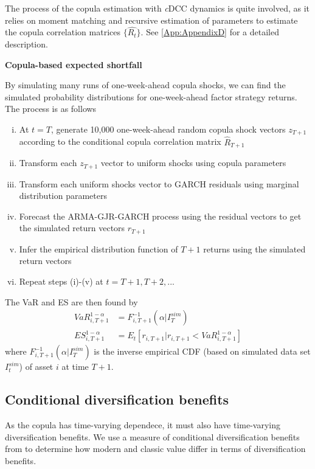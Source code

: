 The process of the copula estimation with \textit{c}DCC dynamics is quite involved, as it relies on moment matching and recursive estimation of parameters to estimate the copula correlation matrices $\{\hat{R_t}\}$. See \autoref{App:AppendixD} for a detailed description.

\textbf{Copula-based expected shortfall}

By simulating many runs of one-week-ahead copula shocks, we can find the simulated probability distributions for one-week-ahead factor strategy returns. The process is as follows
\begin{enumerate}[(i)]
    \item At $t = T$, generate 10,000 one-week-ahead random copula shock vectors $z_{T+1}$ according to the conditional copula correlation matrix $\hat{R}_{T+1}$
    \item Transform each $z_{T+1}$ vector to uniform shocks using copula parameters
    \item Transform each uniform shocks vector to GARCH residuals using marginal distribution parameters
    \item Forecast the ARMA-GJR-GARCH process using the residual vectors to get the simulated return vectors $r_{T+1}$
    \item Infer the empirical distribution function of $T+1$ returns using the simulated return vectors
    \item Repeat steps (i)-(v) at $t = T+1, T+2, ...$
\end{enumerate}
The VaR and ES are then found by
\begin{align}
    VaR_{i,T+1}^{1-\alpha} &= F_{i, T+1}^{-1}(\alpha | I^{sim}_T) \\
    ES_{i, T+1}^{1 - \alpha} &= E_t[r_{i,T+1} | r_{i,T+1} < VaR_{i,T+1}^{1-\alpha}]
\end{align}
where $F_{i, T+1}^{-1}(\alpha | I^{sim}_T)$ is the inverse empirical CDF (based on simulated data set $I^{sim}_t$) of asset $i$ at time $T+1$.

\subsection{Conditional diversification benefits}
As the copula has time-varying dependece, it must also have time-varying diversification benefits. We use a measure of conditional diversification benefits from \textcite{ChristoffersenErrunzaJacobLanglois2012} to determine how modern and classic value differ in terms of diversification benefits. 

